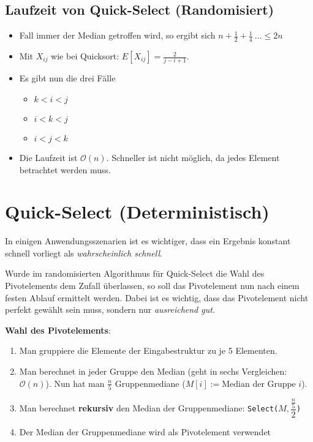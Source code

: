 \documentclass{scrartcl}%
\begin{document}
    \subsection*{Laufzeit von Quick-Select (Randomisiert)}\label{subsec:laufzeitVonQuick-selectrandomisiert}
    \begin{itemize}
        \item Fall immer der Median getroffen wird, so ergibt sich $n+\frac{1}{2}+\frac{1}{4}\ ... \leq 2n$
        \item Mit $X_{ij}$ wie bei Quicksort: $E[X_{ij}] = \frac{2}{j-i+1}$.
        \item [] Es gibt nun die drei Fälle
        \begin{itemize}
            \item $k<i<j$
            \item $i<k<j$
            \item $i<j<k$
        \end{itemize}
        \item [\Rightarrow] Die Laufzeit ist $\mathcal{O}(n)$.
        Schneller ist nicht möglich, da jedes Element betrachtet werden muss.
    \end{itemize}

    \section*{Quick-Select (Deterministisch)}\label{sec:quick-selectdeterministisch}
    In einigen Anwendungsszenarien ist es wichtiger, dass ein Ergebnis konstant schnell vorliegt als \textit{wahrscheinlich schnell}.

    Wurde im randomisierten Algorithmus für Quick-Select die Wahl des Pivotelements dem Zufall überlassen,
    so soll das Pivotelement nun nach einem festen Ablauf ermittelt werden.
    Dabei ist es wichtig, dass das Pivotelement nicht perfekt gewählt sein muss, sondern nur \textit{ausreichend gut}.

    \vspace{0.3cm}
    \textsf{\textbf{Wahl des Pivotelements}}:
    \begin{enumerate}
        \item Man gruppiere die Elemente der Eingabestruktur zu je 5 Elementen.
        \item Man berechnet in jeder Gruppe den Median (geht in sechs Vergleichen: $\mathcal{O}(n)$).
        Nun hat man $\frac{n}{5}$ Gruppenmediane ($M[i] := \text{Median der Gruppe }i$).
        \item Man berechnet \textbf{rekursiv} den Median der Gruppenmediane: \texttt{Select($M, \dfrac{\frac{n}{5}}{2}$)}
        \item Der Median der Gruppenmediane wird als Pivotelement verwendet
    \end{enumerate}
\end{document}
